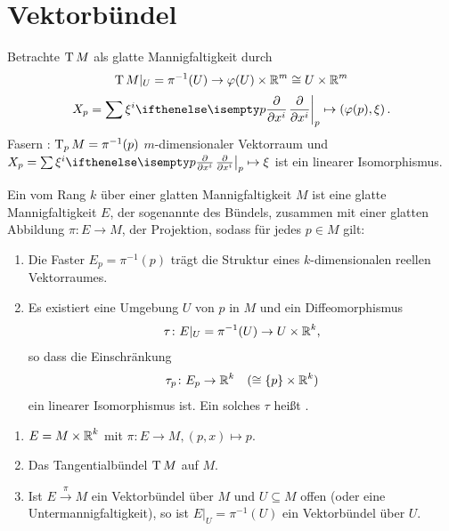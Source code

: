 \chapter{Vektorbündel}

Betrachte $\operatorname{T} M$ als glatte Mannigfaltigkeit durch
	\[ \operatorname{T} M|_U = \pi^{-1}(U) \to \varphi(U) \times \operatorname{\mathbb{R}}^m \cong U \times \operatorname{\mathbb{R}}^m \]
	\[ X_p = \sum \xi^i\pdifffrac[p]{}{x^i} \mapsto \left(\varphi(p),\xi\right). \]
Fasern : $\operatorname{T}_pM = \pi^{-1}(p)$ $m$-dimensionaler Vektorraum und $X_p = \sum \xi^i \pdifffrac[p]{}{x^i} \mapsto \xi$ ist ein linearer Isomorphismus.

\begin{Dfn}
  Ein  vom Rang $k$ über einer glatten Mannigfaltigkeit $M$ ist eine glatte Mannigfaltigkeit $E$, der sogenannte  des Bündels, zusammen mit einer glatten Abbildung $\pi \colon E \to M$, der Projektion, sodass für jedes $p \in M$ gilt:
  \begin{enumerate}[label=(\roman*)]
  \item Die Faster $E_p = \pi^{-1}(p)$ trägt die Struktur eines $k$-dimensionalen reellen Vektorraumes.
  \item Es existiert eine Umgebung $U$ von $p$ in $M$ und ein Diffeomorphismus
    \begin{align*}
      \tau \colon E|_U = \pi^{-1}(U) \to U \times \operatorname{\mathbb{R}}^k,
    \end{align*}
    so dass die Einschränkung
    \begin{align*}
      \tau_p \colon E_p \to \operatorname{\mathbb{R}}^k \quad ( \cong \{p\} \times \operatorname{\mathbb{R}}^k)
    \end{align*}
    ein linearer Isomorphismus ist.
    Ein solches $\tau$ heißt .
  \end{enumerate}
\end{Dfn}

\begin{bsp}
  \begin{enumerate}[label=(\arabic*)]
  \item $E = M \times \operatorname{\mathbb{R}}^k$ mit $\pi \colon E \to M, (p,x) \mapsto p$.
  \item Das Tangentialbündel $\operatorname{T} M$ auf $M$.
  \item Ist $E \xrightarrow{\pi} M$ ein Vektorbündel über $M$ und $U \subseteq M$ offen (oder eine Untermannigfaltigkeit), so ist $E|_U = \pi^{-1}(U)$ ein Vektorbündel über $U$.
  \end{enumerate}
\end{bsp}

